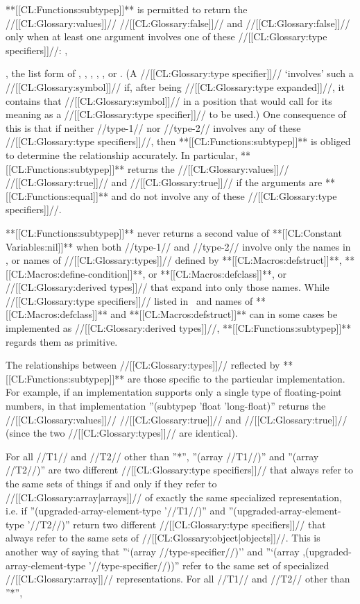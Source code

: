 **[[CL:Functions:subtypep]]** is permitted to return the //[[CL:Glossary:values]]// //[[CL:Glossary:false]]// and //[[CL:Glossary:false]]// only when at least one argument involves one of these //[[CL:Glossary:type specifiers]]//: ,

, the list form of , , , , , or . (A //[[CL:Glossary:type specifier]]// `involves' such a //[[CL:Glossary:symbol]]// if, after being //[[CL:Glossary:type expanded]]//, it contains that //[[CL:Glossary:symbol]]// in a position that would call for its meaning as a //[[CL:Glossary:type specifier]]// to be used.) One consequence of this is that if neither //type-1// nor //type-2// involves any of these //[[CL:Glossary:type specifiers]]//, then **[[CL:Functions:subtypep]]** is obliged to determine the relationship accurately. In particular, **[[CL:Functions:subtypep]]** returns the //[[CL:Glossary:values]]// //[[CL:Glossary:true]]// and //[[CL:Glossary:true]]// if the arguments are **[[CL:Functions:equal]]** and do not involve any of these //[[CL:Glossary:type specifiers]]//.

**[[CL:Functions:subtypep]]** never returns a second value of **[[CL:Constant Variables:nil]]** when both //type-1// and //type-2// involve only the names in \figref\StandardizedAtomicTypeSpecs, or names of //[[CL:Glossary:types]]// defined by **[[CL:Macros:defstruct]]**, **[[CL:Macros:define-condition]]**, or **[[CL:Macros:defclass]]**, or //[[CL:Glossary:derived types]]// that expand into only those names. While //[[CL:Glossary:type specifiers]]// listed in \figref\StandardizedAtomicTypeSpecs\ and names of **[[CL:Macros:defclass]]** and **[[CL:Macros:defstruct]]** can in some cases be implemented as //[[CL:Glossary:derived types]]//, **[[CL:Functions:subtypep]]** regards them as primitive.

The relationships between //[[CL:Glossary:types]]// reflected by **[[CL:Functions:subtypep]]** are those specific to the particular implementation. For example, if an implementation supports only a single type of floating-point numbers, in that implementation ''(subtypep 'float 'long-float)'' returns the //[[CL:Glossary:values]]// //[[CL:Glossary:true]]// and //[[CL:Glossary:true]]// (since the two //[[CL:Glossary:types]]// are identical).

For all //T1// and //T2// other than ''*'', ''(array //T1//)'' and ''(array //T2//)'' are two different //[[CL:Glossary:type specifiers]]// that always refer to the same sets of things if and only if they refer to //[[CL:Glossary:array|arrays]]// of exactly the same specialized representation, i.e. if ''(upgraded-array-element-type '//T1//)'' and ''(upgraded-array-element-type '//T2//)'' return two different //[[CL:Glossary:type specifiers]]// that always refer to the same sets of //[[CL:Glossary:object|objects]]//. This is another way of saying that ''`(array //type-specifier//)'' and ''`(array ,(upgraded-array-element-type '//type-specifier//))'' refer to the same set of specialized //[[CL:Glossary:array]]// representations. For all //T1// and //T2// other than ''*'',

